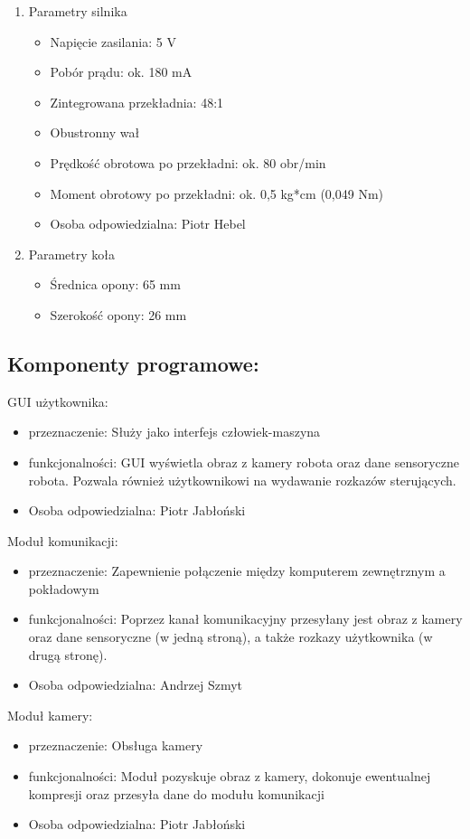 \documentclass[a4paper]{article}
\begin{document}
\begin{enumerate}
\item Parametry silnika
\begin{itemize}
\item Napięcie zasilania: 5 V
\item Pobór prądu: ok. 180 mA
\item Zintegrowana przekładnia: 48:1
\item Obustronny wał
\item Prędkość obrotowa po przekładni: ok. 80 obr/min
\item Moment obrotowy po przekładni: ok. 0,5 kg*cm (0,049 Nm)
\item Osoba odpowiedzialna: Piotr Hebel
\end{itemize}

\item Parametry koła
\begin{itemize}
\item Średnica opony: 65 mm
\item Szerokość opony: 26 mm
\end{itemize}
\end{enumerate}

\subsection{Komponenty programowe:}
GUI użytkownika:
\begin{itemize}
\item przeznaczenie: Służy jako interfejs człowiek-maszyna
\item funkcjonalności: GUI wyświetla obraz z kamery robota oraz dane sensoryczne robota. Pozwala również użytkownikowi na wydawanie rozkazów sterujących. 
\item Osoba odpowiedzialna: Piotr Jabłoński
\end{itemize}

Moduł komunikacji:
\begin{itemize}
\item przeznaczenie: Zapewnienie połączenie między komputerem zewnętrznym a pokładowym
\item funkcjonalności: Poprzez kanał komunikacyjny przesyłany jest obraz z kamery oraz dane sensoryczne (w jedną stroną), a także rozkazy użytkownika (w drugą stronę).
\item Osoba odpowiedzialna: Andrzej Szmyt
\end{itemize}

Moduł kamery:
\begin{itemize}
\item przeznaczenie: Obsługa kamery
\item funkcjonalności: Moduł pozyskuje obraz z kamery, dokonuje ewentualnej kompresji oraz przesyła dane do modułu komunikacji
\item Osoba odpowiedzialna: Piotr Jabłoński
\end{itemize}
\end{document}
